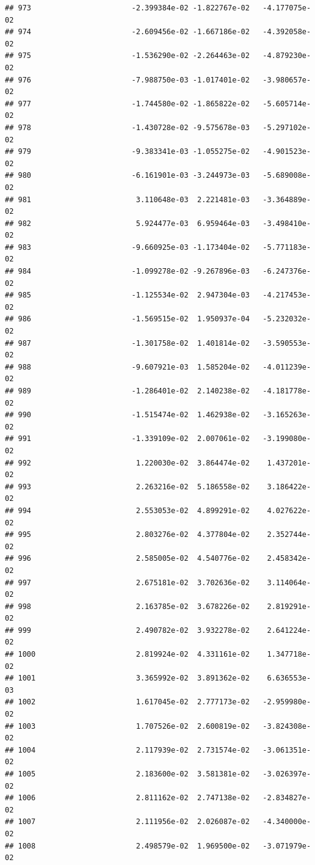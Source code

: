 \documentclass[
]{article}
\begin{document}
\begin{verbatim}
## 973                       -2.399384e-02 -1.822767e-02   -4.177075e-02
## 974                       -2.609456e-02 -1.667186e-02   -4.392058e-02
## 975                       -1.536290e-02 -2.264463e-02   -4.879230e-02
## 976                       -7.988750e-03 -1.017401e-02   -3.980657e-02
## 977                       -1.744580e-02 -1.865822e-02   -5.605714e-02
## 978                       -1.430728e-02 -9.575678e-03   -5.297102e-02
## 979                       -9.383341e-03 -1.055275e-02   -4.901523e-02
## 980                       -6.161901e-03 -3.244973e-03   -5.689008e-02
## 981                        3.110648e-03  2.221481e-03   -3.364889e-02
## 982                        5.924477e-03  6.959464e-03   -3.498410e-02
## 983                       -9.660925e-03 -1.173404e-02   -5.771183e-02
## 984                       -1.099278e-02 -9.267896e-03   -6.247376e-02
## 985                       -1.125534e-02  2.947304e-03   -4.217453e-02
## 986                       -1.569515e-02  1.950937e-04   -5.232032e-02
## 987                       -1.301758e-02  1.401814e-02   -3.590553e-02
## 988                       -9.607921e-03  1.585204e-02   -4.011239e-02
## 989                       -1.286401e-02  2.140238e-02   -4.181778e-02
## 990                       -1.515474e-02  1.462938e-02   -3.165263e-02
## 991                       -1.339109e-02  2.007061e-02   -3.199080e-02
## 992                        1.220030e-02  3.864474e-02    1.437201e-02
## 993                        2.263216e-02  5.186558e-02    3.186422e-02
## 994                        2.553053e-02  4.899291e-02    4.027622e-02
## 995                        2.803276e-02  4.377804e-02    2.352744e-02
## 996                        2.585005e-02  4.540776e-02    2.458342e-02
## 997                        2.675181e-02  3.702636e-02    3.114064e-02
## 998                        2.163785e-02  3.678226e-02    2.819291e-02
## 999                        2.490782e-02  3.932278e-02    2.641224e-02
## 1000                       2.819924e-02  4.331161e-02    1.347718e-02
## 1001                       3.365992e-02  3.891362e-02    6.636553e-03
## 1002                       1.617045e-02  2.777173e-02   -2.959980e-02
## 1003                       1.707526e-02  2.600819e-02   -3.824308e-02
## 1004                       2.117939e-02  2.731574e-02   -3.061351e-02
## 1005                       2.183600e-02  3.581381e-02   -3.026397e-02
## 1006                       2.811162e-02  2.747138e-02   -2.834827e-02
## 1007                       2.111956e-02  2.026087e-02   -4.340000e-02
## 1008                       2.498579e-02  1.969500e-02   -3.071979e-02

\end{verbatim}
\end{document}
